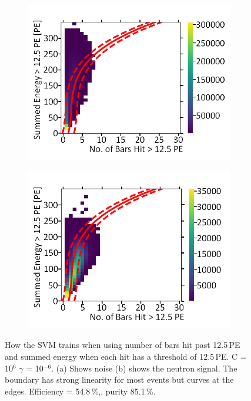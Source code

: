 \begin{figure}[!h]
\centering
\begin{subfigure}{.5\textwidth}
  \centering
  \includegraphics[width=\linewidth]{Appendix1/Figs/Bars2Sum2Noise.png}
  \captionsetup{width=.9\linewidth}
  \caption{}
  \label{subFig:Bars2Sum2N}
\end{subfigure}%
\begin{subfigure}{.5\textwidth}
  \centering
\includegraphics[width=\linewidth]{Appendix1/Figs/Bars2Sum2Signal.png}
  \captionsetup{width=.9\linewidth}
  \caption{}
  \label{subFig:Bars2Sum2S}
\end{subfigure}
\caption{How the SVM trains when using number of bars hit past 12.5\,PE and summed energy when each hit has a threshold of 12.5\,PE. C = 10$^6$ $\gamma$ = 10$^{-6}$. (a) Shows noise (b) shows the neutron signal. The boundary has strong linearity for most events but curves at the edges. Efficiency = 54.8\,\%,, purity 85.1\,\%.}
\label{fig:Bars2Sum2SN}
\end{figure}


